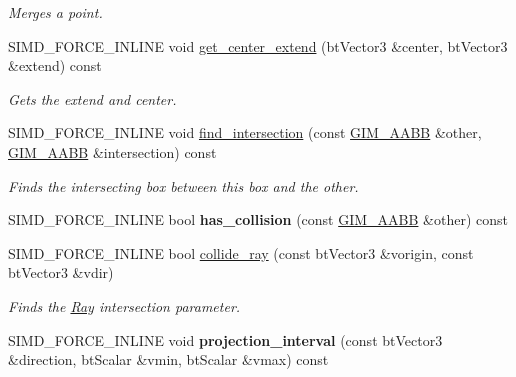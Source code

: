 \begin{DoxyCompactItemize}
\begin{DoxyCompactList}\small\item\em Merges a point. \end{DoxyCompactList}\item 
\mbox{\label{classGIM__AABB_ae618503bf46d8ddee2ea78e252617c71}} 
S\+I\+M\+D\+\_\+\+F\+O\+R\+C\+E\+\_\+\+I\+N\+L\+I\+NE void \hyperlink{classGIM__AABB_ae618503bf46d8ddee2ea78e252617c71}{get\+\_\+center\+\_\+extend} (bt\+Vector3 \&center, bt\+Vector3 \&extend) const
\begin{DoxyCompactList}\small\item\em Gets the extend and center. \end{DoxyCompactList}\item 
\mbox{\label{classGIM__AABB_add403806d9332e67d501fc439a429848}} 
S\+I\+M\+D\+\_\+\+F\+O\+R\+C\+E\+\_\+\+I\+N\+L\+I\+NE void \hyperlink{classGIM__AABB_add403806d9332e67d501fc439a429848}{find\+\_\+intersection} (const \hyperlink{classGIM__AABB}{G\+I\+M\+\_\+\+A\+A\+BB} \&other, \hyperlink{classGIM__AABB}{G\+I\+M\+\_\+\+A\+A\+BB} \&intersection) const
\begin{DoxyCompactList}\small\item\em Finds the intersecting box between this box and the other. \end{DoxyCompactList}\item 
\mbox{\label{classGIM__AABB_a68ac57bfd8a5481b04e0c31454fb4d45}} 
S\+I\+M\+D\+\_\+\+F\+O\+R\+C\+E\+\_\+\+I\+N\+L\+I\+NE bool {\bfseries has\+\_\+collision} (const \hyperlink{classGIM__AABB}{G\+I\+M\+\_\+\+A\+A\+BB} \&other) const
\item 
S\+I\+M\+D\+\_\+\+F\+O\+R\+C\+E\+\_\+\+I\+N\+L\+I\+NE bool \hyperlink{classGIM__AABB_a1fafc37703d288fd0fe862b861829287}{collide\+\_\+ray} (const bt\+Vector3 \&vorigin, const bt\+Vector3 \&vdir)
\begin{DoxyCompactList}\small\item\em Finds the \hyperlink{classRay}{Ray} intersection parameter. \end{DoxyCompactList}\item 
\mbox{\label{classGIM__AABB_a7802bf10dabdbdb9f15ceefba6289466}} 
S\+I\+M\+D\+\_\+\+F\+O\+R\+C\+E\+\_\+\+I\+N\+L\+I\+NE void {\bfseries projection\+\_\+interval} (const bt\+Vector3 \&direction, bt\+Scalar \&vmin, bt\+Scalar \&vmax) const

\end{DoxyCompactItemize}
